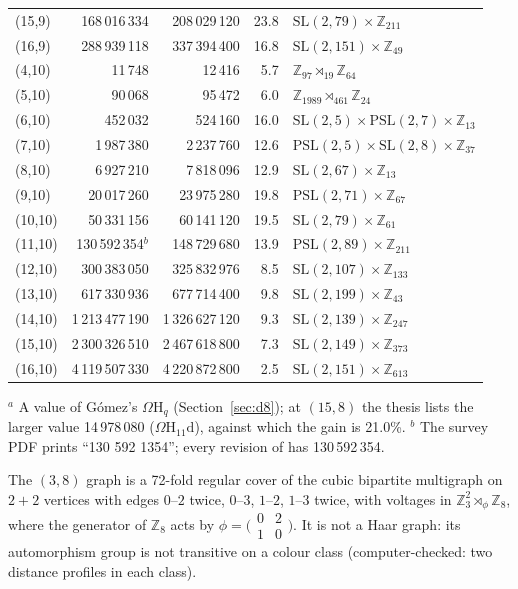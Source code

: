 \documentclass[11pt]{amsart}
\theoremstyle{definition}
\theoremstyle{remark}
\numberwithin{equation}{section}
\newcommand{\Z}{\mathbb Z}
\newcommand{\SL}{\mathrm{SL}}
\newcommand{\PSL}{\mathrm{PSL}}
\newcommand{\Om}{\Omega\mathrm H}
\begin{document}
\begin{longtable}{@{}l r r r p{6.3cm}@{}}
(15,9) & 168\,016\,334 & 208\,029\,120 & 23.8 & $\SL(2,79)\times\Z_{211}$\\
(16,9) & 288\,939\,118 & 337\,394\,400 & 16.8 & $\SL(2,151)\times\Z_{49}$\\
(4,10) & 11\,748 & 12\,416 & 5.7 & $\Z_{97}\rtimes_{19}\Z_{64}$\\
(5,10) & 90\,068 & 95\,472 & 6.0 & $\Z_{1989}\rtimes_{461}\Z_{24}$\\
(6,10) & 452\,032 & 524\,160 & 16.0 & $\SL(2,5)\times\PSL(2,7)\times\Z_{13}$\\
(7,10) & 1\,987\,380 & 2\,237\,760 & 12.6 & $\PSL(2,5)\times\SL(2,8)\times\Z_{37}$\\
(8,10) & 6\,927\,210 & 7\,818\,096 & 12.9 & $\SL(2,67)\times\Z_{13}$\\
(9,10) & 20\,017\,260 & 23\,975\,280 & 19.8 & $\PSL(2,71)\times\Z_{67}$\\
(10,10) & 50\,331\,156 & 60\,141\,120 & 19.5 & $\SL(2,79)\times\Z_{61}$\\
(11,10) & 130\,592\,354$^b$ & 148\,729\,680 & 13.9 & $\PSL(2,89)\times\Z_{211}$\\
(12,10) & 300\,383\,050 & 325\,832\,976 & 8.5 & $\SL(2,107)\times\Z_{133}$\\
(13,10) & 617\,330\,936 & 677\,714\,400 & 9.8 & $\SL(2,199)\times\Z_{43}$\\
(14,10) & 1\,213\,477\,190 & 1\,326\,627\,120 & 9.3 & $\SL(2,139)\times\Z_{247}$\\
(15,10) & 2\,300\,326\,510 & 2\,467\,618\,800 & 7.3 & $\SL(2,149)\times\Z_{373}$\\
(16,10) & 4\,119\,507\,330 & 4\,220\,872\,800 & 2.5 & $\SL(2,151)\times\Z_{613}$\\
\end{longtable}
\noindent $^a$ A value of G\'omez's $\Om_q$ (Section~\ref{sec:d8}); at $(15,8)$ the thesis lists the larger value
14\,978\,080 ($\Om_{11}\mathrm d$), against which the gain is 21.0\%.
$^b$ The survey PDF prints ``130 592 1354''; every revision of \cite{CW} has 130\,592\,354.

The $(3,8)$ graph is a 72-fold regular cover of the cubic bipartite multigraph on $2+2$ vertices with edges $0$--$2$ twice,
$0$--$3$, $1$--$2$, $1$--$3$ twice, with voltages in $\Z_3^2\rtimes_\phi\Z_8$, where the generator of $\Z_8$ acts by
$\phi=\bigl(\begin{smallmatrix}0&2\\1&0\end{smallmatrix}\bigr)$. It is not a Haar graph: its automorphism group is not
transitive on a colour class (computer-checked: two distance profiles in each class).
\end{document}

